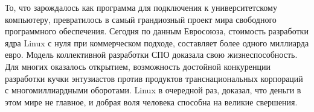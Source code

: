 \conclusion
То, что зарождалось как программа для подключения к университетскому компьютеру, превратилось в самый грандиозный проект мира свободного программного обеспечения. Сегодня по данным Евросоюза, стоимость разработки ядра Linux с нуля при коммерческом подходе, составляет более одного миллиарда евро. Модель коллективной разработки СПО доказала свою жизнеспособность. Для многих оказалось открытием, возможность достойной конкуренции разработки кучки энтузиастов против продуктов транснациональных корпораций с многомиллиардными оборотами. Linux в очередной раз, доказал, что деньги в этом мире не главное, и добрая воля человека способна на великие свершения.
